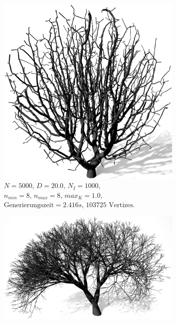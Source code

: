 \begin{figure} [hbtp]
	\centering
	\begin{subfigure}[t]{.45\textwidth}
		\centering
		\includegraphics[height=.2\textheight]{images/Performance_SCA_Quali_Segments_High.png}
		\caption{$N = 5000$, $D = 20.0$, $N_I = 1000$,\\ $n_{min} = 8$, $n_{max} = 8$, $max_K = 1.0$,\\  $\text{Generierungszeit} = 2.416s$, $103725 \text{ Vertizes}$.}
		\label{subfig:Performance_SCA_Quali_Segments_High}
	\end{subfigure}
	\hspace{.05\linewidth}
	\begin{subfigure}[t]{.45\textwidth}
		\centering
		\includegraphics[height=.2\textheight]{images/Performance_LS_Ternary_4_Tropism.png}

\end{subfigure}
\end{figure}
